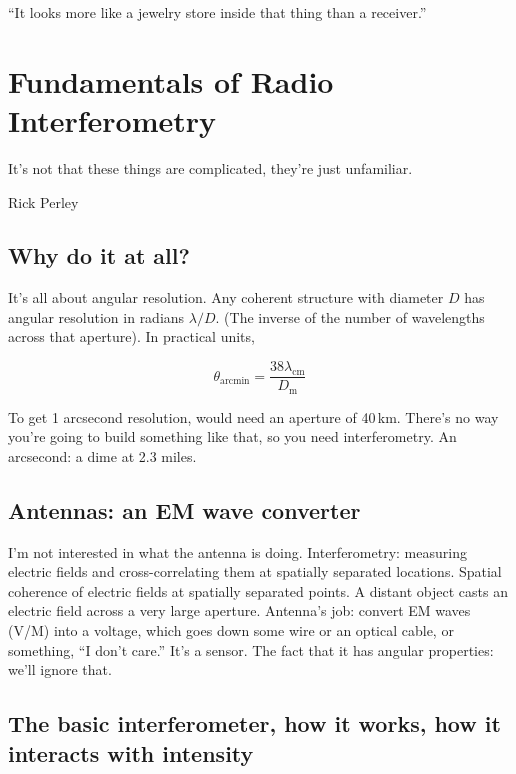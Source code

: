 \documentclass[a4paper]{article}
\begin{document}
``It looks more like a jewelry store inside that thing than a receiver.''

\section{Fundamentals of Radio Interferometry}

\epigraph{It's not that these things are complicated, they're just unfamiliar.}{Rick Perley}

\subsection{Why do it at all?}

It's all about angular resolution. Any coherent structure with diameter $D$ has angular resolution in radians $\lambda / D$. (The inverse of the number of wavelengths across that aperture). In practical units,

$$ \theta_\mathrm{arcmin} = \frac{38 \lambda_\mathrm{cm}}{D_\mathrm{m}} $$

To get 1 arcsecond resolution, would need an aperture of 40\,km. There's no way you're going to build something like that, so you need interferometry. An arcsecond: a dime at 2.3 miles. 

\subsection{Antennas: an EM wave converter}

I'm not interested in what the antenna is doing. Interferometry: measuring electric fields and cross-correlating them at spatially separated locations. Spatial coherence of electric fields at spatially separated points. A distant object casts an electric field across a very large aperture. Antenna's job: convert EM waves (V/M) into a voltage, which goes down some wire or an optical cable, or something, ``I don't care.'' It's a sensor. The fact that it has angular properties: we'll ignore that. 

\subsection{The basic interferometer, how it works, how it interacts with intensity}
\end{document}
